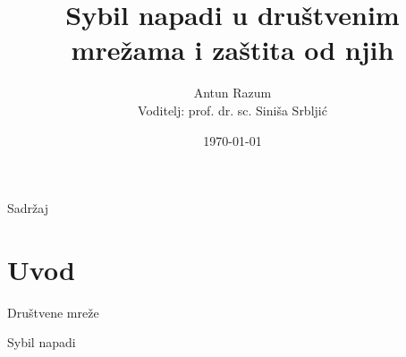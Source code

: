 \documentclass{beamer}
\title{Sybil napadi u društvenim mrežama i zaštita od njih}
\author{Antun Razum\\{\small Voditelj: prof. dr. sc. Siniša Srbljić}}
\institute{Fakultet elektrotehnike i računarstva}
\date{\today}
\begin{document}
\maketitle

\begin{frame}{Sadržaj}
  \tableofcontents
\end{frame}

\section{Uvod}

\begin{frame}{Društvene mreže}
\end{frame}

\begin{frame}{Sybil napadi}
\end{frame}
\end{document}
